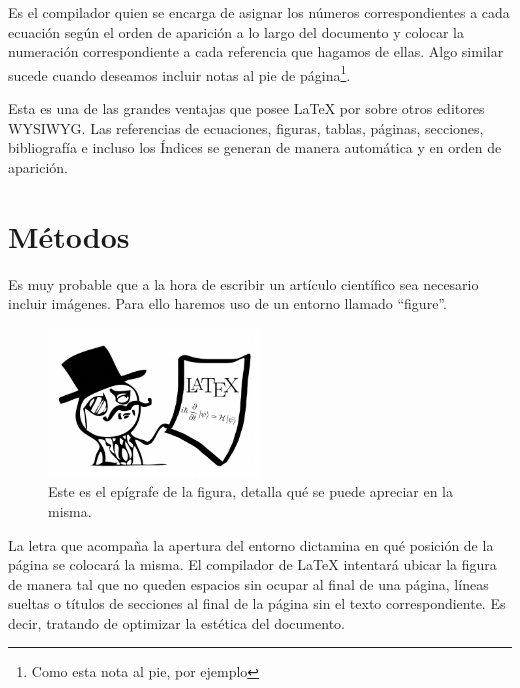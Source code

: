 \documentclass[a4paper,11pt,twoside]{article}
\begin{document}
Es el compilador quien se encarga de asignar los números correspondientes a cada ecuación según el orden de aparición a lo largo del documento y colocar la numeración correspondiente a cada referencia que hagamos de ellas. Algo similar sucede cuando deseamos incluir notas al pie de página\footnote{Como esta nota al pie, por ejemplo}.

Esta es una de las grandes ventajas que posee {\LaTeX} por sobre otros editores WYSIWYG. Las referencias de ecuaciones, figuras, tablas, páginas, secciones, bibliografía e incluso los Índices se generan de manera automática y en orden de aparición.

\section{Métodos}
Es muy probable que a la hora de escribir un artículo científico sea necesario incluir imágenes. Para ello haremos uso de un entorno llamado ``figure''.

\begin{figure}[t] %
\centering %
\includegraphics[width=0.5\textwidth]{figs/latex.jpg}
\caption{Este es el epígrafe de la figura, detalla qué se puede apreciar en la misma.}
\label{fig:latex} %
\end{figure}

La letra que acompaña la apertura del entorno dictamina en qué posición de la página se colocará la misma. El compilador de {\LaTeX} intentará ubicar la figura de manera tal que no queden espacios sin ocupar al final de una página, líneas sueltas o títulos de secciones al final de la página sin el texto correspondiente. Es decir, tratando de optimizar la estética del documento.
\end{document}
